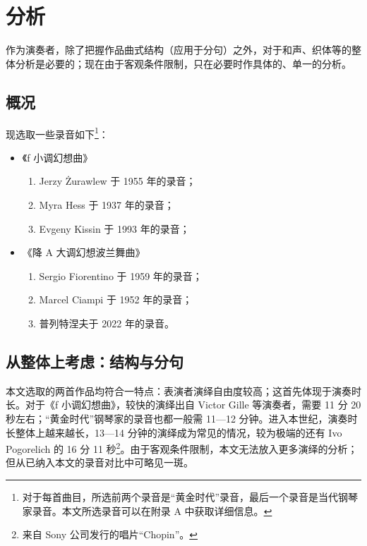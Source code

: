     \section{\heiti \fontsize{16}{19.2}\selectfont 分析}
    作为演奏者，除了把握作品曲式结构（应用于分句）之外，对于和声、织体等的整体分析是必要的；现在由于客观条件限制，只在必要时作具体的、单一的分析。
    \subsection{\heiti \fontsize{15}{18}\selectfont 概况}
    现选取一些录音如下\footnote{对于每首曲目，所选前两个录音是“黄金时代”录音，最后一个录音是当代钢琴家录音。本文所选录音可以在附录 A 中获取详细信息。}：

    \begin{itemize}
    \item 《f 小调幻想曲》
        \begin{enumerate}
            \item Jerzy Żurawlew 于 1955 年的录音；
            \item Myra Hess 于 1937 年的录音；
            \item Evgeny Kissin 于 1993 年的录音；
        \end{enumerate}
    \item 《降 A 大调幻想波兰舞曲》
        \begin{enumerate}
            \item Sergio Fiorentino 于 1959 年的录音；
            \item Marcel Ciampi 于 1952 年的录音；
            \item 普列特涅夫于 2022 年的录音。
        \end{enumerate}
    \end{itemize}

    \subsection{\heiti \fontsize{15}{18}\selectfont 从整体上考虑：结构与分句}
    本文选取的两首作品均符合一特点：表演者演绎自由度较高；这首先体现于演奏时长。对于《f 小调幻想曲》，较快的演绎出自 Victor Gille 等演奏者，需要 11 分 20 秒左右；“黄金时代”钢琴家的录音也都一般需 11—12 分钟。进入本世纪，演奏时长整体上越来越长，13—14 分钟的演绎成为常见的情况，较为极端的还有 Ivo Pogorelich 的 16 分 11 秒\footnote{来自 Sony 公司发行的唱片“Chopin”。}。由于客观条件限制，本文无法放入更多演绎的分析；但从已纳入本文的录音对比中可略见一斑。


